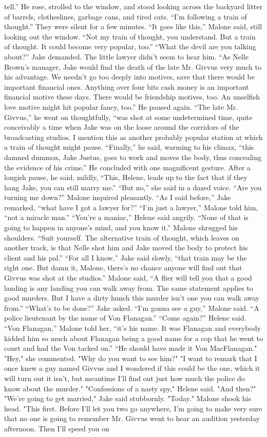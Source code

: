\documentclass{novel}
\begin{document}
tell.” He rose, strolled to the window, and stood looking across the backyard litter of barrels, clotheslines, garbage cans, and tired cats. “I’m following a train of thought.” They were silent for a few minutes. “It goes like this,” Malone said, still looking out the window. “Not my train of thought, you understand. But a train of thought. It could become very popular, too.” “What the devil are you talking about?” Jake demanded. The little lawyer didn’t seem to hear him. “As Nelle Brown’s manager, Jake would find the death of the late Mr. Givvus very much to his advantage. We needn’t go too deeply into motives, save that there would be important financial ones. Anything over four bits cash money is an important financial motive these days. There would be friendship motives, too. An unselfish love motive might hit popular fancy, too.” He paused again. “The late Mr. Givvus,” he went on thoughtfully, “was shot at some undetermined time, quite conceivably a time when Jake was on the loose around the corridors of the broadcasting studios. I mention this as another probably popular station at which a train of thought might pause. “Finally,” he said, warming to his climax, “this damned dummox, Jake Justus, goes to work and moves the body, thus concealing the evidence of his crime.” He concluded with one magnificent gesture. After a longish pause, he said, mildly, “This, Helene, leads up to the fact that if they hang Jake, you can still marry me.” “But no,” she said in a dazed voice. “Are you turning me down?” Malone inquired pleasantly. “As I said before,” Jake remarked, “what have I got a lawyer for?” “I’m just a lawyer,” Malone told him, “not a miracle man.” “You’re a maniac,” Helene said angrily. “None of that is going to happen in anyone’s mind, and you know it.” Malone shrugged his shoulders. “Suit yourself. The alternative train of thought, which leaves on another track, is that Nelle shot him and Jake moved the body to protect his client and his pal.” “For all I know,” Jake said slowly, “that train may be the right one. But damn it, Malone, there’s no chance anyone will find out that Givvus was shot at the studios.” Malone said, “A flier will tell you that a good landing is any landing you can walk away from. The same statement applies to good murders. But I have a dirty hunch this murder isn’t one you can walk away from.” “What’s to be done?” Jake asked. “I’m gonna see a guy,” Malone said. “A police lieutenant by the name of Von Flanagan.” “Come again?” Helene said. “Von Flanagan,” Malone told her, “it’s his name. It was Flanagan and everybody kidded him so much about Flanagan being a good name for a cop that he went to court and had the Von tacked on.” “He should have made it Von MacFlanagan." "Hey," she commented. "Why do you want to see him?" "I want to remark that I once knew a guy named Givvus and I wondered if this could be the one, which it will turn out it isn't, but meantime I'll find out just how much the police do know about the murder." "Confessions of a nasty spy," Helene said. "And then?" "We're going to get married," Jake said stubbornly. "Today." Malone shook his head. "This first. Before I'll let you two go anywhere, I'm going to make very sure that no one is going to remember Mr. Givvus went to hear an audition yesterday afternoon. Then I'll speed you on 
\end{document}
